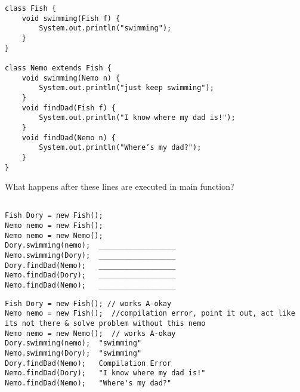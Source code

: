 \begin{blocksection}
\question
\begin{lstlisting}
class Fish {
    void swimming(Fish f) {
        System.out.println("swimming");
    }
}

class Nemo extends Fish {
    void swimming(Nemo n) {
        System.out.println("just keep swimming");
    }
    void findDad(Fish f) {
        System.out.println("I know where my dad is!");
    }
    void findDad(Nemo n) {
        System.out.println("Where’s my dad?");
    }
}

\end{lstlisting}

What happens after these lines are executed in main function?

\begin{verbatim}

Fish Dory = new Fish(); 
Nemo nemo = new Fish();  
Nemo nemo = new Nemo();  
Dory.swimming(nemo);  __________________
Nemo.swimming(Dory);  __________________
Dory.findDad(Nemo);   __________________
Nemo.findDad(Dory);   __________________
Nemo.findDad(Nemo);   __________________

\end{verbatim}
\newpage
\begin{solution}
\begin{verbatim}
Fish Dory = new Fish(); // works A-okay
Nemo nemo = new Fish();  //compilation error, point it out, act like its not there & solve problem without this nemo
Nemo nemo = new Nemo();  // works A-okay
Dory.swimming(nemo);  "swimming"
Nemo.swimming(Dory);  "swimming"
Dory.findDad(Nemo);   Compilation Error
Nemo.findDad(Dory);   "I know where my dad is!"
Nemo.findDad(Nemo);   "Where's my dad?"

\end{verbatim}
\end{solution}

\end{blocksection}